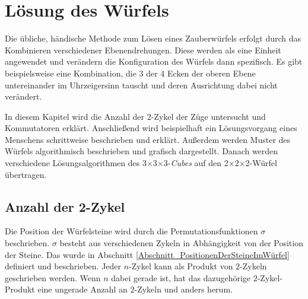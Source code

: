 \documentclass[12pt,a4paper, usenames, dvipsnames]{article}
\theoremstyle{mystyle}
\theoremstyle{definition}
\newcommand{\Ttwo}{2$\times$2$\times$2-}
\newcommand{\Tthree}{3$\times$3$\times$3-}
\begin{document}
\section{Lösung des Würfels}

\label{Kapitel_Lösung}

Die übliche, händische Methode zum Lösen eines Zauberwürfels erfolgt durch das Kombinieren verschiedener Ebenendrehungen. Diese werden als eine Einheit angewendet und verändern die Konfiguration des Würfels dann spezifisch. 
Es gibt beispielsweise eine Kombination, die 3 der 4 Ecken der oberen Ebene untereinander im Uhrzeigersinn tauscht und deren Ausrichtung dabei nicht verändert. 

In diesem Kapitel wird die Anzahl der $2$-Zykel der Züge untersucht und Kommutatoren erklärt.
Anschließend wird beispielhaft ein Lösungsvorgang eines Menschens schrittweise beschrieben und erklärt.
Außerdem werden Muster des Würfels algorithmisch beschrieben und grafisch dargestellt.
Danach werden verschiedene Lösungsalgorithmen des \Tthree \textit{Cubes} auf den \Ttwo Würfel übertragen.

%
%
%
%
%
%
%
%
%
%
%
%
%
%
%
%
%
%
%
%
\subsection{Anzahl der 2-Zykel}

Die Position der Würfelsteine wird durch die Permutationsfunktionen $\sigma$ beschrieben.  $\sigma$ besteht aus verschiedenen Zykeln in Abhängigkeit von der Position der Steine. Das wurde in Abschnitt \ref{Abschnitt_PositionenDerSteineImWürfel} definiert und beschrieben. Jeder $n$-Zykel kann als Produkt von $2$-Zykeln geschrieben werden. Wenn $n$ dabei gerade ist, hat das dazugehörige $2$-Zykel-Produkt eine ungerade Anzahl an $2$-Zykeln und anders herum. \cite{TD}
\end{document}
